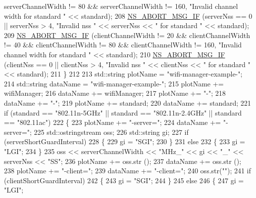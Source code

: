 \begin{DoxyCode}
      serverChannelWidth != 80 && serverChannelWidth != 160, \textcolor{stringliteral}{"Invalid channel width for standard "} << standard);
208       \hyperlink{group__fatal_ga6653324225bc139e46deea177614ceee}{NS\_ABORT\_MSG\_IF} (serverNss == 0 || serverNss > 4, \textcolor{stringliteral}{"Invalid nss "} << serverNss << \textcolor{stringliteral}{" for
       standard "} << standard);
209       \hyperlink{group__fatal_ga6653324225bc139e46deea177614ceee}{NS\_ABORT\_MSG\_IF} (clientChannelWidth != 20 && clientChannelWidth != 40 && 
      clientChannelWidth != 80 && clientChannelWidth != 160, \textcolor{stringliteral}{"Invalid channel width for standard "} << standard);
210       \hyperlink{group__fatal_ga6653324225bc139e46deea177614ceee}{NS\_ABORT\_MSG\_IF} (clientNss == 0 || clientNss > 4, \textcolor{stringliteral}{"Invalid nss "} << clientNss << \textcolor{stringliteral}{" for
       standard "} << standard);
211     \}
212 
213   std::string plotName = \textcolor{stringliteral}{"wifi-manager-example-"};
214   std::string dataName = \textcolor{stringliteral}{"wifi-manager-example-"};
215   plotName += wifiManager;
216   dataName += wifiManager;
217   plotName += \textcolor{stringliteral}{"-"};
218   dataName += \textcolor{stringliteral}{"-"};
219   plotName += standard;
220   dataName += standard;
221   \textcolor{keywordflow}{if} (standard == \textcolor{stringliteral}{"802.11n-5GHz"} || standard == \textcolor{stringliteral}{"802.11n-2.4GHz"} || standard == \textcolor{stringliteral}{"802.11ac"})
222     \{
223       plotName += \textcolor{stringliteral}{"-server="};
224       dataName += \textcolor{stringliteral}{"-server="};
225       std::ostringstream oss;
226       std::string gi;
227       \textcolor{keywordflow}{if} (serverShortGuardInterval)
228         \{
229           gi = \textcolor{stringliteral}{"SGI"};
230         \}
231       \textcolor{keywordflow}{else}
232         \{
233           gi = \textcolor{stringliteral}{"LGI"};
234         \}
235       oss << serverChannelWidth << \textcolor{stringliteral}{"MHz\_"} << gi << \textcolor{stringliteral}{"\_"} << serverNss << \textcolor{stringliteral}{"SS"};
236       plotName += oss.str ();
237       dataName += oss.str ();
238       plotName += \textcolor{stringliteral}{"-client="};
239       dataName += \textcolor{stringliteral}{"-client="};
240       oss.str(\textcolor{stringliteral}{""});
241       \textcolor{keywordflow}{if} (clientShortGuardInterval)
242         \{
243           gi = \textcolor{stringliteral}{"SGI"};
244         \}
245       \textcolor{keywordflow}{else}
246         \{
247           gi = \textcolor{stringliteral}{"LGI"};

\end{DoxyCode}
